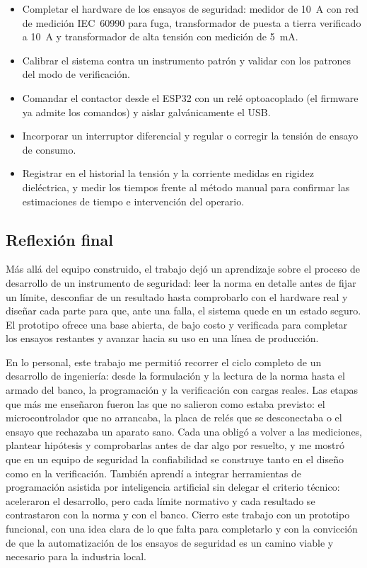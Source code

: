 \begin{itemize}
    \item Completar el hardware de los ensayos de seguridad: medidor de
          \SI{10}{\ampere} con red de medición IEC~60990 para fuga, transformador
          de puesta a tierra verificado a \SI{10}{\ampere} y transformador de alta
          tensión con medición de \SI{5}{\milli\ampere}.
    \item Calibrar el sistema contra un instrumento patrón y validar con los
          patrones del modo de verificación.
    \item Comandar el contactor desde el ESP32 con un relé optoacoplado (el
          firmware ya admite los comandos) y aislar galvánicamente el USB.
    \item Incorporar un interruptor diferencial y regular o corregir la tensión de
          ensayo de consumo.
    \item Registrar en el historial la tensión y la corriente medidas en rigidez
          dieléctrica, y medir los tiempos frente al método manual para
          confirmar las estimaciones de tiempo e intervención del operario.
\end{itemize}

\subsection{Reflexión final}

Más allá del equipo construido, el trabajo dejó un aprendizaje sobre el proceso
de desarrollo de un instrumento de seguridad: leer la norma en detalle antes de
fijar un límite, desconfiar de un resultado hasta comprobarlo con el hardware real
y diseñar cada parte para que, ante una falla, el sistema quede en un estado
seguro. El prototipo ofrece una base abierta, de bajo costo y verificada para
completar los ensayos restantes y avanzar hacia su uso en una línea de producción.

En lo personal, este trabajo me permitió recorrer el ciclo completo de un
desarrollo de ingeniería: desde la formulación y la lectura de la norma hasta el
armado del banco, la programación y la verificación con cargas reales. Las
etapas que más me enseñaron fueron las que no salieron como estaba previsto: el
microcontrolador que no arrancaba, la placa de relés que se desconectaba o el
ensayo que rechazaba un aparato sano. Cada una obligó a volver a las mediciones,
plantear hipótesis y comprobarlas antes de dar algo por resuelto, y me mostró que
en un equipo de seguridad la confiabilidad se construye tanto en el diseño como
en la verificación. También aprendí a integrar herramientas de programación
asistida por inteligencia artificial sin delegar el criterio técnico: aceleraron
el desarrollo, pero cada límite normativo y cada resultado se contrastaron con la
norma y con el banco. Cierro este trabajo con un prototipo funcional, con una
idea clara de lo que falta para completarlo y con la convicción de que la
automatización de los ensayos de seguridad es un camino viable y necesario para
la industria local.
